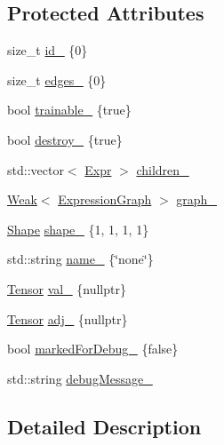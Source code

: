 \subsection*{Protected Attributes}
\begin{DoxyCompactItemize}
\item 
size\+\_\+t \hyperlink{classmarian_1_1Node_aa088753e0e801e0d5cfe8161a1781f3d}{id\+\_\+} \{0\}
\item 
size\+\_\+t \hyperlink{classmarian_1_1Node_aece3097fea8e6ba25623a2c942d50fa8}{edges\+\_\+} \{0\}
\item 
bool \hyperlink{classmarian_1_1Node_a2be04ac02fd33f507b55ab5915cad5cc}{trainable\+\_\+} \{true\}
\item 
bool \hyperlink{classmarian_1_1Node_aa83237be30a1afc0f0423b23d534d2d3}{destroy\+\_\+} \{true\}
\item 
std\+::vector$<$ \hyperlink{namespacemarian_a498d8baf75b754011078b890b39c8e12}{Expr} $>$ \hyperlink{classmarian_1_1Node_a4d44ab201d96c0f283188bcc91f64b1d}{children\+\_\+}
\item 
\hyperlink{namespacemarian_acde6307b95538fbf82548c2e1108ccf4}{Weak}$<$ \hyperlink{classmarian_1_1ExpressionGraph}{Expression\+Graph} $>$ \hyperlink{classmarian_1_1Node_ace278ed3e34d2ac833a0a1cf48ae3337}{graph\+\_\+}
\item 
\hyperlink{structmarian_1_1Shape}{Shape} \hyperlink{classmarian_1_1Node_a54d7d94c76c2b943959a8e902a12b015}{shape\+\_\+} \{1, 1, 1, 1\}
\item 
std\+::string \hyperlink{classmarian_1_1Node_ad09fba82157b376108163b8575971d09}{name\+\_\+} \{\char`\"{}none\char`\"{}\}
\item 
\hyperlink{namespacemarian_a88b71ec34bb354564cddc24eb80f7e14}{Tensor} \hyperlink{classmarian_1_1Node_ab64614c39ead91341c3d485dd0817cab}{val\+\_\+} \{nullptr\}
\item 
\hyperlink{namespacemarian_a88b71ec34bb354564cddc24eb80f7e14}{Tensor} \hyperlink{classmarian_1_1Node_a13a0badd98010fdd2536cb5d055ade5a}{adj\+\_\+} \{nullptr\}
\item 
bool \hyperlink{classmarian_1_1Node_a666eca0dd7946a8438f71f0e14c0155c}{marked\+For\+Debug\+\_\+} \{false\}
\item 
std\+::string \hyperlink{classmarian_1_1Node_a98e7e9a443d642dc1aeadb2f015a12e0}{debug\+Message\+\_\+}
\end{DoxyCompactItemize}


\subsection{Detailed Description}


